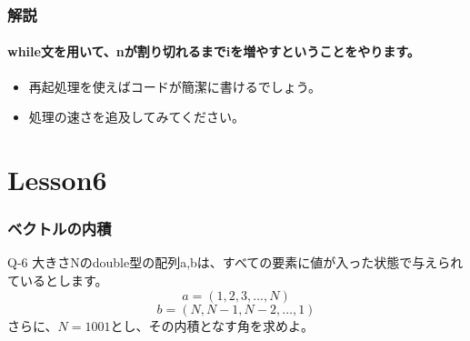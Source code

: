\documentclass[dvipdfmx]{beamer}
\begin{document}
\begin{frame}
	\frametitle{解説}
	\framesubtitle{while文を用いて、nが割り切れるまでiを増やすということをやります。}
	\begin{itemize}
		\item 再起処理を使えばコードが簡潔に書けるでしょう。
		\item 処理の速さを追及してみてください。
	\end{itemize}
\end{frame}

\section{Lesson6}
\begin{frame}
	\frametitle{ベクトルの内積}
	\begin{itembox}[l]{Q-6}
		大きさNのdouble型の配列a,bは、すべての要素に値が入った状態で与えられているとします。\\
		$$a = (1,2,3,\dots,N)$$
		$$b = (N, N-1, N-2,\dots,1)$$
		さらに、$N=1001$とし、その内積となす角を求めよ。
	\end{itembox}
\end{frame}
\end{document}
